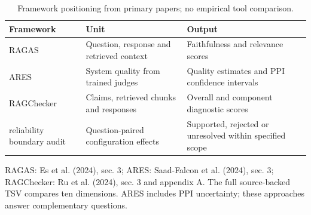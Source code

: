 \begin{table}[!htbp]
\centering\footnotesize
\caption{Framework positioning from primary papers; no empirical tool comparison.}
\label{tab:framework_comparison}
\begin{threeparttable}
\setlength{\tabcolsep}{3pt}
\begin{tabular}{p{}p{}p{}}
\toprule
Framework & Unit & Output \\
\midrule
RAGAS & Question, response and retrieved context & Faithfulness and relevance scores \\
ARES & System quality from trained judges & Quality estimates and PPI confidence intervals \\
RAGChecker & Claims, retrieved chunks and responses & Overall and component diagnostic scores \\
reliability boundary audit & Question-paired configuration effects & Supported, rejected or unresolved within specified scope \\
\bottomrule
\end{tabular}
\begin{tablenotes}\scriptsize\item RAGAS: Es et al. (2024), sec. 3; ARES: Saad-Falcon et al. (2024), sec. 3; RAGChecker: Ru et al. (2024), sec. 3 and appendix A. The full source-backed TSV compares ten dimensions. ARES includes PPI uncertainty; these approaches answer complementary questions.
\end{tablenotes}
\end{threeparttable}
\end{table}
